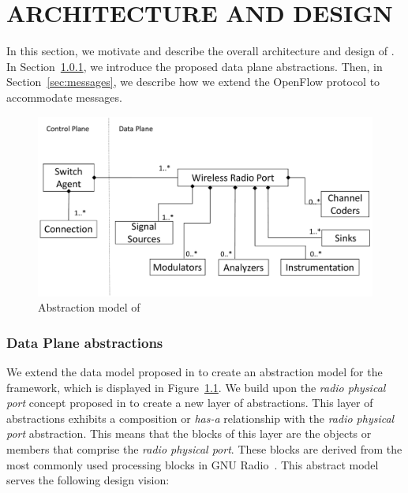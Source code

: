 \chapter{\uppercase {Architecture and Design}}
\label{sec:architecture}

In this section, we motivate and describe the overall architecture and design of \crossflow. In Section~\ref{sec:data_plane}, we introduce the proposed data plane abstractions. Then, in Section~\ref{sec:messages}, we describe how we extend the OpenFlow protocol to accommodate \crossflow messages.


\begin{figure}[t]
  \centering
  \includegraphics[width=1\textwidth]{figures/UML.pdf}
  \caption{Abstraction model of \crossflow}
  \label{fig:uml}
\end{figure}


\subsection{Data Plane abstractions}
\label{sec:data_plane}
We extend the data model proposed in \cite{Casey:14} to create an abstraction model for the \crossflow framework, which is displayed in Figure~\ref{fig:uml}. We build upon the \emph{radio physical port} concept proposed in \cite{aetherflow} to create a new layer of abstractions. This layer of abstractions exhibits a composition or \emph{has-a} relationship with the \emph{radio physical port} abstraction. This means that the blocks of this layer are the objects or members that comprise the \emph{radio physical port}. These blocks are derived from the most commonly used processing blocks in GNU Radio~\cite{gnuradio}. This abstract model serves the following design vision:

